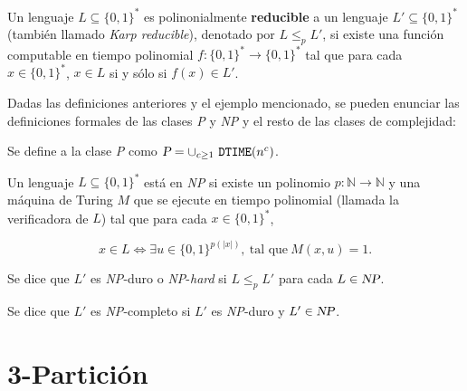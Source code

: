  \theoremstyle{definition}
 \begin{definition}
Un lenguaje $L \subseteq \{0,1\}^{*}$ es polinonialmente \textbf{reducible} a
un lenguaje $L' \subseteq \{0,1\}^{*}$ (también llamado
\textit{Karp reducible}), denotado por $L \leq_{p} L'$, si existe una
función computable en tiempo polinomial
$f : \{0,1\}^{*} \longrightarrow \{0,1\}^{*}$ tal que para cada
$x \in \{0,1\}^{*}$, $x \in L$ si y sólo si $f(x) \in L'$.
 \end{definition}

\noindent
Dadas las definiciones anteriores y el ejemplo mencionado, se pueden enunciar las
definiciones formales de las clases \textsl{P} y \textsl{NP} y el resto de las
clases de complejidad:


 \theoremstyle{definition}
 \begin{definition}
 Se define a la clase \textsl{P} como
  $\textsl{P} = \cup_{c \geq 1} ~ \texttt{DTIME}(n^{c})$.
   \end{definition}

 \theoremstyle{definition}
 \begin{definition}
Un lenguaje $L \subseteq \{0, 1\}^{*}$ está en \textsl{NP} si existe un
  polinomio $p: \mathbb{N} \longrightarrow \mathbb{N}$ y una máquina de Turing $M$
  que se ejecute en tiempo polinomial (llamada la verificadora de $L$) tal
  que para cada $x \in \{0,1\}^{*}$,
\end{definition}

  \begin{displaymath}
    x \in L \Leftrightarrow \exists u \in \{0,1\}^{p(|x|)},~
    \textrm{tal que} ~ M(x,u) = 1.
  \end{displaymath}

 \theoremstyle{definition}
 \begin{definition}
  Se dice que $L'$ es \textsl{NP}-duro o \textsl{NP}-\textit{hard} si
  $L \leq_{p} L'$ para cada $L \in \textsl{NP} $.
  \end{definition}

 \theoremstyle{definition}
 \begin{definition}
 Se dice que $L'$ es \textsl{NP}-completo si $L'$ es \textsl{NP}-duro y
  $L' \in \textsl{NP}$.
    \end{definition}




\section{3-Partición}
\label{sec:3-particion}

